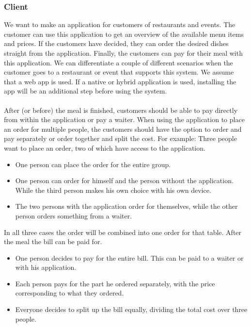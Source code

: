 \documentclass[12pt]{article}
\begin{document}
\subsubsection{Client}
We want to make an application for customers of restaurants and events. The customer can use this application to get an overview of the available menu items and prices. If the customers have decided, they can order the desired dishes straight from the application. Finally, the customers can pay for their meal with this application.
We can differentiate a couple of different scenarios when the customer goes to a restaurant or event that supports this system. We assume that a web app is used. If a native or hybrid application is used, installing the app will be an additional step before using the system.
\\\\
After (or before) the meal is finished, customers should be able to pay directly from within the application or pay a waiter. When using the application to place an order for multiple people, the customers should have the option to order and pay separately or order together and split the cost. 
For example: Three people want to place an order, two of which have access to the application. 
\begin{itemize}
\item One person can place the order for the entire group.
\item One person can order for himself and the person without the application. While the third person makes his own choice with his own device.
\item The two persons with the application order for themselves, while the other person orders something from a waiter.
\end{itemize}

\noindent 
In all three cases the order will be combined into one order for that table. After the meal the bill can be paid for.

\begin{itemize}
	\item One person decides to pay for the entire bill. This can be paid to a waiter or with his application.
	\item Each person pays for the part he ordered separately, with the price corresponding to what they ordered.
	\item Everyone decides to split up the bill equally, dividing the total cost over three people. 
\end{itemize}
\end{document}
